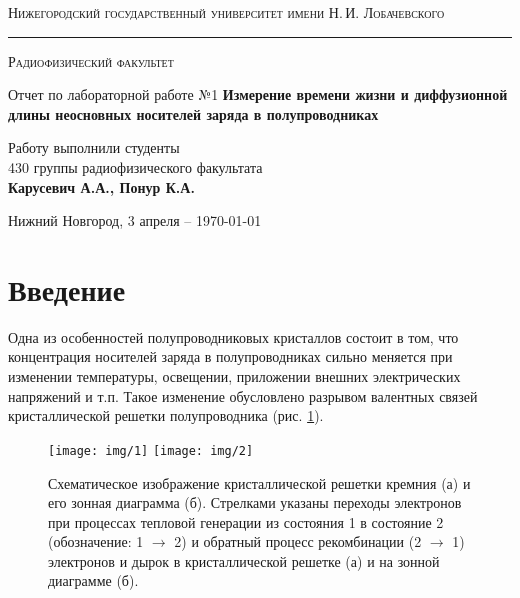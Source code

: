 \documentclass[a4paper,12pt]{article}
\def\labauthor{Карусевич А.А., Понур К.А.}
\def\labnumber{1}
\def\labtheme{Измерение времени жизни и диффузионной длины неосновных 
носителей заряда в полупроводниках}
\begin{document}
\begin{titlepage}
\begin{center}

{\textsc{Нижегородский государственный университет имени Н.\,И. Лобачевского}}
\vskip 2pt \hrule \vskip 3pt
{\textsc{Радиофизический факультет}}

\vfill


{{\LARGE Отчет по лабораторной работе №\labnumber}\vskip 12pt {\Huge \bfseries \labtheme}}

	
\vspace{2cm}
{\large Работу выполнили студенты \\[-0.25em] 430 группы радиофизического факультата \\[0.5em] {\Large \bfseries \labauthor}}



\end{center}

\vfill
	
	
	
\begin{center}
	{Нижний Новгород, 3 апреля -- \today}
\end{center}

\end{titlepage}
\tableofcontents
\newpage

\section*{Введение}

Одна из особенностей полупроводниковых кристаллов состоит в том, что концентрация носителей заряда в полупроводниках сильно меняется при изменении температуры, освещении, приложении внешних электрических напряжений и т.п. Такое изменение обусловлено разрывом валентных связей кристаллической решетки полупроводника (рис. \ref{fig:figure1}).
\begin{figure}[H]
	\centering
	\texttt{[image: img/1]}
	\texttt{[image: img/2]}
	\caption{Схематическое изображение кристаллической решетки кремния (а) и его зонная диаграмма (б). Стрелками указаны переходы электронов при процессах тепловой генерации из состояния 1 в состояние 2 (обозначение: 1 $\to$ 2) и обратный процесс рекомбинации (2 $\to$ 1) электронов и дырок в кристаллической решетке (а) и на зонной диаграмме (б).}
	\label{fig:figure1}
\end{figure}
\end{document}
